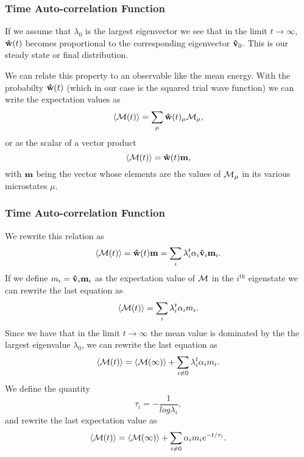 \documentclass[compress]{beamer}
\begin{document}
\frame
{
  \frametitle{Time Auto-correlation Function}
\begin{small}
{\scriptsize
If we assume that $\lambda_0$ is the largest eigenvector we see that in the limit $t\rightarrow \infty$,
${\bf \hat{w}}(t)$ becomes proportional to the corresponding eigenvector 
${\bf \hat{v}}_0$. This is our steady state or final distribution. 

We can relate this property to an observable like the mean energy.
With the probabilty ${\bf \hat{w}}(t)$ (which in our case is the squared trial wave function) we
can write the expectation values as 
\[
 \langle {\cal M}(t) \rangle  = \sum_{\mu} {\bf \hat{w}}(t)_{\mu}{\cal M}_{\mu},
\]  
or as the scalar of a  vector product
 \[
 \langle {\cal M}(t) \rangle  = {\bf \hat{w}}(t){\bf m},
\]  
with ${\bf m}$ being the vector whose elements are the values of ${\cal M}_{\mu}$ in its 
various microstates $\mu$.
}
\end{small}
}


\frame
{
  \frametitle{Time Auto-correlation Function}
\begin{small}
{\scriptsize
We rewrite this relation  as
 \[
 \langle {\cal M}(t) \rangle  = {\bf \hat{w}}(t){\bf m}=\sum_i\lambda_i^t\alpha_i{\bf \hat{v}}_i{\bf m}_i.
\]  
If we define $m_i={\bf \hat{v}}_i{\bf m}_i$ as the expectation value of
${\cal M}$ in the $i^{\mathrm{th}}$ eigenstate we can rewrite the last equation as
 \[
 \langle {\cal M}(t) \rangle  = \sum_i\lambda_i^t\alpha_im_i.
\] 
Since we have that in the limit $t\rightarrow \infty$ the mean value is dominated by the 
the largest eigenvalue $\lambda_0$, we can rewrite the last equation as
 \[
 \langle {\cal M}(t) \rangle  = \langle {\cal M}(\infty) \rangle+\sum_{i\ne 0}\lambda_i^t\alpha_im_i.
\] 
We define the quantity
\[
   \tau_i=-\frac{1}{log\lambda_i},
\]
and rewrite the last expectation value as
 \[
 \langle {\cal M}(t) \rangle  = \langle {\cal M}(\infty) \rangle+\sum_{i\ne 0}\alpha_im_ie^{-t/\tau_i}.
\label{eq:finalmeanm}
\] 
}
\end{small}
}
\end{document}
